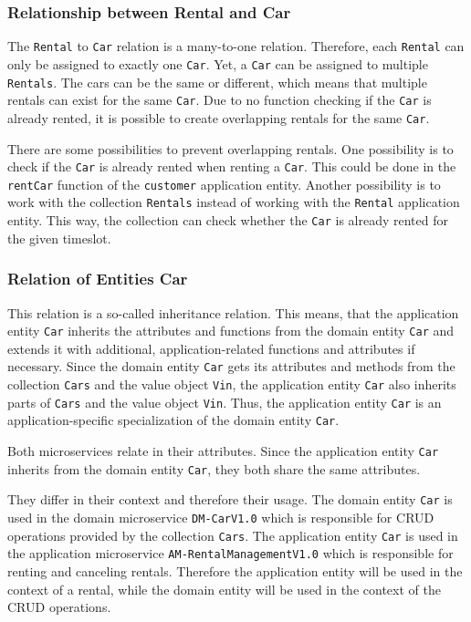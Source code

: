 \subsubsection*{Relationship between Rental and Car}
The \texttt{Rental} to \texttt{Car} relation is a many-to-one relation.
Therefore, each \texttt{Rental} can only be assigned to exactly one \texttt{Car}.
Yet, a \texttt{Car} can be assigned to multiple \texttt{Rentals}.
The cars can be the same or different, which means that multiple rentals can exist for the same \texttt{Car}.
Due to no function checking if the \texttt{Car} is already rented, it is possible to create overlapping rentals for the same \texttt{Car}.

There are some possibilities to prevent overlapping rentals.
One possibility is to check if the \texttt{Car} is already rented when renting a \texttt{Car}.
This could be done in the \texttt{rentCar} function of the \texttt{customer} application entity.
Another possibility is to work with the collection \texttt{Rentals} instead of working with the \texttt{Rental} application entity.
This way, the collection can check whether the \texttt{Car} is already rented for the given timeslot.

\subsubsection*{Relation of Entities Car}
This relation is a so-called inheritance relation.
This means, that the application entity \texttt{Car} inherits the attributes and functions from the domain entity \texttt{Car} and extends it with additional, application-related functions and attributes if necessary.
Since the domain entity \texttt{Car} gets its attributes and methods from the collection \texttt{Cars} and the value object \texttt{Vin}, the application entity \texttt{Car} also inherits parts of \texttt{Cars} and the value object \texttt{Vin}.
Thus, the application entity \texttt{Car} is an application-specific specialization of the domain entity \texttt{Car}.

Both microservices relate in their attributes.
Since the application entity \texttt{Car} inherits from the domain entity \texttt{Car}, they both share the same attributes.

They differ in their context and therefore their usage.
The domain entity \texttt{Car} is used in the domain microservice \texttt{DM-CarV1.0} which is responsible for CRUD operations provided by the collection \texttt{Cars}.
The application entity \texttt{Car} is used in the application microservice \texttt{AM-RentalManagementV1.0} which is responsible for renting and canceling rentals.
Therefore the application entity will be used in the context of a rental, while the domain entity will be used in the context of the CRUD operations.

